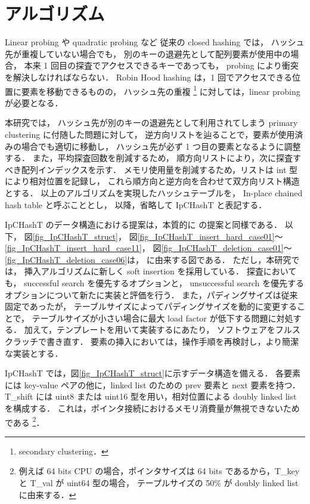 \chapter{アルゴリズム}
\label{chap_Algorism}

Linear probing や quadratic probing など
従来の closed hashing では，
ハッシュ先が重複していない場合でも，
別のキーの退避先として配列要素が使用中の場合，
本来 1 回目の探査でアクセスできるキーであっても，
probing により衝突を解決しなければならない．
Robin Hood hashing は，1 回でアクセスできる位置に要素を移動できるものの，
ハッシュ先の重複 \footnote{secondary clustering．} に対しては，linear probing が必要となる．

本研究では，
ハッシュ先が別のキーの退避先として利用されてしまう primary clustering に付随した問題に対して，
逆方向リストを辿ることで，要素が使用済みの場合でも適切に移動し，
ハッシュ先が必ず 1 つ目の要素となるように調整する．
また，平均探査回数を削減するため，
順方向リストにより，次に探査すべき配列インデックスを示す．
メモリ使用量を削減するため，リストは int 型により相対位置を記録し，
これら順方向と逆方向を合わせて双方向リスト構造とする．
以上のアルゴリズムを実現したハッシュテーブルを，
In-place chained hash table と呼ぶこととし，
以降，省略して IpCHashT と表記する．

IpCHashT のデータ構造における提案は，本質的に \cite{ADMIS2017} の提案と同様である．
以下，
図\ref{fig_IpCHashT_struct}，
図\ref{fig_IpCHashT_insert_hard_case01}〜\ref{fig_IpCHashT_insert_hard_case11}，
図\ref{fig_IpCHashT_deletion_case01}〜\ref{fig_IpCHashT_deletion_case06}は，
\cite{ADMIS2017} に由来する図である．
ただし，本研究では，
挿入アルゴリズムに新しく soft insertion を採用している．
探査においても，
successful search を優先するオプションと，
unsuccessful search を優先するオプションについて新たに実装と評価を行う．
また，パディングサイズは従来固定であったが，
テーブルサイズによってパディングサイズを動的に変更することで，
テーブルサイズが小さい場合に最大 load factor が低下する問題に対処する．
加えて，テンプレートを用いて実装するにあたり，
ソフトウェアをフルスクラッチで書き直す．
要素の挿入においては，操作手順を再検討し，より簡潔な実装とする．

IpCHashT では，図\ref{fig_IpCHashT_struct}に示すデータ構造を備える．
各要素には key-value ペアの他に，linked list のための prev 要素と next 要素を持つ．
T\_shift には uint8 または uint16 型を用い，相対位置による doubly linked list を構成する．
これは，ポインタ接続におけるメモリ消費量が無視できないためである
\footnote{
  例えば 64 bits CPU の場合，ポインタサイズは 64 bits であるから，T\_key と T\_val が uint64 型の場合，
  テープルサイズの 50\% が doubly linked list に由来する．
}．
\leavevmode \newline

